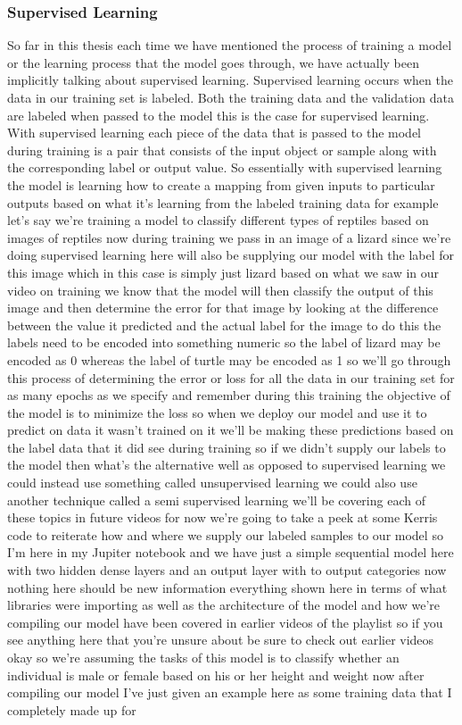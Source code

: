 \subsubsection{Supervised Learning}
\par
So far in this thesis each time we have mentioned the process of training a model or the learning process that the model goes through, we have actually been implicitly talking about supervised learning. Supervised learning occurs when the data in our training set is labeled. Both the training data and the validation data are labeled when passed to the model this is the case for supervised learning. With supervised learning each piece of the data that is passed to the model during training is a pair that consists of the input object or sample along with the corresponding label or output value. So essentially with supervised learning the model is learning how to create a mapping from given inputs to particular outputs based on what it's learning from the labeled training data for example let's say we're training a model to classify different types of reptiles based on images of reptiles now during training we pass in an image of a lizard since we're doing supervised learning here will also be supplying our model with the label for this image which in this case is simply just lizard based on what we saw in our video on training we know that the model will then classify the output of this image and then determine the error for that image by looking at the difference between the value it predicted and the actual label for the image to do this the labels need to be encoded into something numeric so the label of lizard may be encoded as 0 whereas the label of turtle may be encoded as 1 so we'll go through this process of determining the error or loss for all the data in our training set for as many epochs as we specify and remember during this training the objective of the model is to minimize the loss so when we deploy our model and use it to predict on data it wasn't trained on it we'll be making these predictions based on the label data that it did see during training so if we didn't supply our labels to the model then what's the alternative well as opposed to supervised learning we could instead use something called unsupervised learning we could also use another technique called a semi supervised learning we'll be covering each of these topics in future videos for now we're going to take a peek at some Kerris code to reiterate how and where we supply our labeled samples to our model so I'm here in my Jupiter notebook and we have just a simple sequential model here with two hidden dense layers and an output layer with to output categories now nothing here should be new information everything shown here in terms of what libraries were importing as well as the architecture of the model and how we're compiling our model have been covered in earlier videos of the playlist so if you see anything here that you're unsure about be sure to check out earlier videos okay so we're assuming the tasks of this model is to classify whether an individual is male or female based on his or her height and weight now after compiling our model I've just given an example here as some training data that I completely made up for 